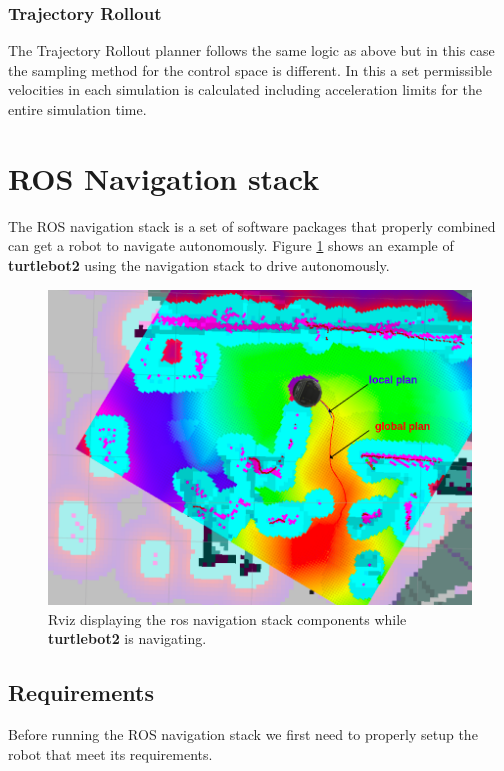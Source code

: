 \subsubsection{Trajectory Rollout} \label{tr}
The Trajectory Rollout planner follows the same logic as above but in this case the sampling method for the control space is different. In this a set permissible velocities
in each simulation is calculated including acceleration limits for the entire simulation
time\cite{inbookdwa}.
\section {ROS Navigation stack}
The ROS navigation stack is a set of software packages that properly combined can get a robot to navigate autonomously.
Figure \ref{fig:plans} shows an example of \textbf{turtlebot2} using the navigation stack to drive autonomously.
\begin{figure}[!htb]
    \centering
    \includegraphics[width=\linewidth]{imgs/chapter3/nav.png}
    \caption[Rviz view of the ROS Navigation Stack]{Rviz displaying the ros navigation stack components while \textbf{turtlebot2} is navigating.}
    \label{fig:plans}
\end{figure}

\subsection{Requirements}
 Before running the \ac{ROS} navigation stack we first need to properly setup the robot that meet its requirements.
